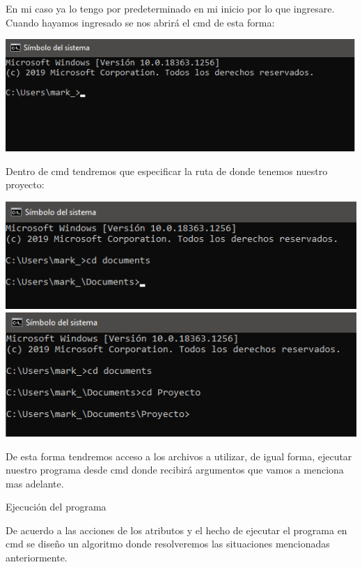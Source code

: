 \documentclass[12pt,letterpaper]{report}
\begin{document}
En mi caso ya lo tengo por predeterminado en mi inicio por lo que ingresare.\\
Cuando hayamos ingresado se nos abrirá el cmd de esta forma:

\begin{center}
\includegraphics[scale=0.5]{ruta1}
\end{center}

Dentro de cmd tendremos que especificar la ruta de donde tenemos nuestro proyecto:

\begin{multicols}{2}
\includegraphics[scale=0.5]{ruta2}
\includegraphics[scale=0.5]{ruta3}
\end{multicols}

De esta forma tendremos acceso a los archivos a utilizar, de igual forma, ejecutar nuestro programa desde cmd donde recibirá argumentos que vamos a menciona mas adelante.

\begin{center}
Ejecución del programa
\end{center}

De acuerdo a las acciones de los atributos y el hecho de ejecutar el programa en cmd se diseño un algoritmo donde resolveremos las situaciones mencionadas anteriormente.\\
\end{document}
